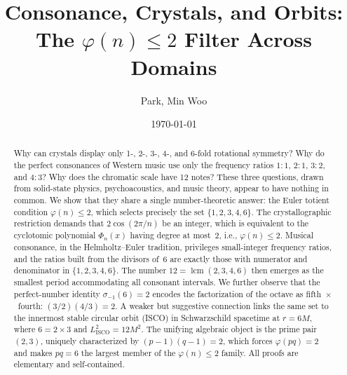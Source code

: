 \documentclass[preprint]{revtex4-2}
\DeclareMathOperator{\lcm}{lcm}
\begin{document}
\title{Consonance, Crystals, and Orbits:\\
The $\varphi(n) \leq 2$ Filter Across Domains}

\author{Park, Min Woo}

\date{\today}

\begin{abstract}
Why can crystals display only 1-, 2-, 3-, 4-, and 6-fold rotational symmetry? Why do the perfect consonances of Western music use only the frequency ratios $1{:}1$, $2{:}1$, $3{:}2$, and $4{:}3$? Why does the chromatic scale have 12 notes? These three questions, drawn from solid-state physics, psychoacoustics, and music theory, appear to have nothing in common. We show that they share a single number-theoretic answer: the Euler totient condition $\varphi(n) \leq 2$, which selects precisely the set $\{1, 2, 3, 4, 6\}$. The crystallographic restriction demands that $2\cos(2\pi/n)$ be an integer, which is equivalent to the cyclotomic polynomial $\Phi_n(x)$ having degree at most~2, i.e., $\varphi(n) \leq 2$. Musical consonance, in the Helmholtz--Euler tradition, privileges small-integer frequency ratios, and the ratios built from the divisors of~6 are exactly those with numerator and denominator in $\{1,2,3,4,6\}$. The number $12 = \lcm(2,3,4,6)$ then emerges as the smallest period accommodating all consonant intervals. We further observe that the perfect-number identity $\sigma_{-1}(6) = 2$ encodes the factorization of the octave as fifth~$\times$~fourth: $(3/2)(4/3) = 2$. A weaker but suggestive connection links the same set to the innermost stable circular orbit (ISCO) in Schwarzschild spacetime at $r = 6M$, where $6 = 2 \times 3$ and $L^2_{\text{ISCO}} = 12M^2$. The unifying algebraic object is the prime pair~$(2,3)$, uniquely characterized by $(p-1)(q-1) = 2$, which forces $\varphi(pq) = 2$ and makes $pq = 6$ the largest member of the $\varphi(n) \leq 2$ family. All proofs are elementary and self-contained.
\end{abstract}



\maketitle
\end{document}
